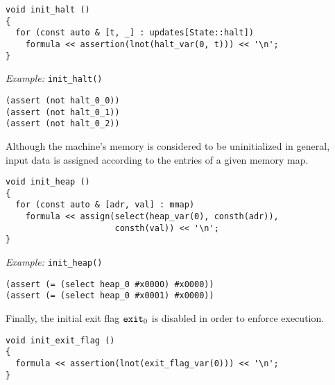 \begin{lstlisting}[style=c++]
void init_halt ()
{
  for (const auto & [t, _] : updates[State::halt])
    formula << assertion(lnot(halt_var(0, t))) << '\n';
}
\end{lstlisting}

\noindent
\emph{Example:} \lstinline[style=c++]{init_halt()}

\begin{lstlisting}[language=SMTLib]
(assert (not halt_0_0))
(assert (not halt_0_1))
(assert (not halt_0_2))
\end{lstlisting}


\noindent
Although the machine's memory is considered to be uninitialized in general, input data is assigned according to the entries of a given memory map.

\begin{lstlisting}[style=c++]
void init_heap ()
{
  for (const auto & [adr, val] : mmap)
    formula << assign(select(heap_var(0), consth(adr)),
                      consth(val)) << '\n';
}
\end{lstlisting}

\noindent
\emph{Example:} \lstinline[style=c++]{init_heap()}

\begin{lstlisting}[language=SMTLib]
(assert (= (select heap_0 #x0000) #x0000))
(assert (= (select heap_0 #x0001) #x0000))
\end{lstlisting}


\noindent
Finally, the initial exit flag $\texttt{exit}_0$ is disabled in order to enforce execution.

\begin{lstlisting}[style=c++]
void init_exit_flag ()
{
  formula << assertion(lnot(exit_flag_var(0))) << '\n';
}
\end{lstlisting}

